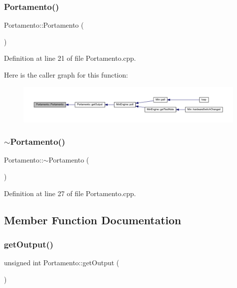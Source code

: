 \subsubsection{\texorpdfstring{Portamento()}{Portamento()}}
{\footnotesize\ttfamily Portamento\+::\+Portamento (\begin{DoxyParamCaption}{ }\end{DoxyParamCaption})}



Definition at line 21 of file Portamento.\+cpp.

Here is the caller graph for this function\+:
\nopagebreak
\begin{figure}[H]
\begin{center}
\leavevmode
\includegraphics[width=350pt]{class_portamento_a80ed457562045ae8d49da317e6a7ba0d_icgraph}
\end{center}
\end{figure}
\mbox{\label{class_portamento_a90f8e862c7a26ade2f7a955eea6da904}} 
\subsubsection{\texorpdfstring{$\sim$\+Portamento()}{~Portamento()}}
{\footnotesize\ttfamily Portamento\+::$\sim$\+Portamento (\begin{DoxyParamCaption}{ }\end{DoxyParamCaption})}



Definition at line 27 of file Portamento.\+cpp.



\subsection{Member Function Documentation}
\mbox{\label{class_portamento_ac9c42e58272962a5a7f7d0300ba2e595}} 
\subsubsection{\texorpdfstring{get\+Output()}{getOutput()}}
{\footnotesize\ttfamily unsigned int Portamento\+::get\+Output (\begin{DoxyParamCaption}{ }\end{DoxyParamCaption})\hspace{0.3cm}{\ttfamily [inline]}}



